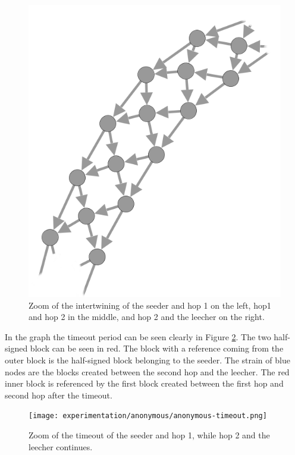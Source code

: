 \begin{figure}
	\centerline{\includegraphics[scale=0.5]{experimentation/anonymous/anonymous-magnified.png}}
	\caption{Zoom of the intertwining of the seeder and hop 1 on the left, hop1 and hop 2 in the middle, and hop 2 and the leecher on the right.}
	\label{fig:synthetic-anonymous-graph-magnified}
\end{figure}

In the graph the timeout period can be seen clearly in Figure \ref{fig:synthetic-anonymous-timeout}.
The two half-signed block can be seen in red.
The block with a reference coming from the outer block is the half-signed block belonging to the seeder.
The strain of blue nodes are the blocks created between the second hop and the leecher.
The red inner block is referenced by the first block created between the first hop and second hop after the timeout.

\begin{figure}
	\centerline{\texttt{[image: experimentation/anonymous/anonymous-timeout.png]}}
	\caption{Zoom of the timeout of the seeder and hop 1, while hop 2 and the leecher continues.}
	\label{fig:synthetic-anonymous-timeout}
\end{figure}



